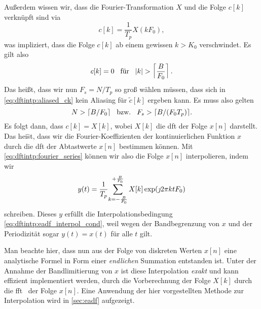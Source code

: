 Au{\ss}erdem wissen wir, dass die Fourier-Transformation $X$ und die Folge $c[k]$ verkn\"upft sind via 
\begin{equation}
    c[k] = \frac{1}{T_p} X(k F_0),
\end{equation}
was impliziert, dass die Folge $c[k]$ ab einem gewissen $k > K_0$ verschwindet.
Es gilt also
\begin{equation}
    c[k] = 0 {\hspace{3mm} \text{f\"ur} \hspace{3mm}} {\left| k \right|} > \left\lceil \frac{B}{F_0} \right\rceil.
\end{equation}
Das hei{\ss}t, dass wir nun $F_s = N/T_p$ so gro{\ss} w\"ahlen m\"ussen, dass sich in \eqref{eq:dftintp:aliased_ck} kein Aliasing f\"ur $\tilde{c}[k]$ ergeben kann.
Es muss also gelten
\begin{equation}
    N > \lceil B/F_0 \rceil {\hspace{3mm} \text{bzw.} \hspace{3mm}} F_s > \lceil B/(F_0 T_p) \rceil.
\end{equation}
Es folgt dann, dass $c[k] = X[k]$, wobei $X[k]$ die \gls{dft} der Folge $x[n]$ darstellt. 
Das hei\"st, dass wir die Fourier-Koeffizienten der kontinuierlichen Funktion $x$ durch die \gls{dft} der Abtastwerte $x[n]$ bestimmen k\"onnen. 
Mit \eqref{eq:dftintp:fourier_series} k\"onnen wir also die Folge $x[n]$ interpolieren, indem wir
\begin{equation}\label{eq:dftintp:dft_interpolation}
    y(t) = \frac{1}{T_p}{\sum\limits_{k=-\frac{B}{F_0}}^{+\frac{B}{F_0}}{
        X[k] \exp(\jmath 2 \pi k t F_0) 
    }}
\end{equation}
schreiben. 
Dieses $y$ erf\"ullt die Interpolationsbedingung \eqref{eq:dftintp:eadf_interpol_cond}, weil wegen der Bandbegrenzung von $x$ und der Periodizit\"at sogar $y(t) = x(t)$ f\"ur alle $t$ gilt.

Man beachte hier, dass nun aus der Folge von diskreten Werten $x[n]$ eine analytische Formel in Form einer \emph{endlichen} Summation entstanden ist. 
Unter der Annahme der Bandlimitierung von $x$ ist diese Interpolation \emph{exakt} und kann effizient implementiert werden, durch die Vorberechnung der Folge $X[k]$ durch die \gls{fft}~\cite{FFTW05} der Folge $x[n]$. 
Eine Anwendung der hier vorgestellten Methode zur Interpolation wird in \cref{sec:eadf} aufgezeigt.